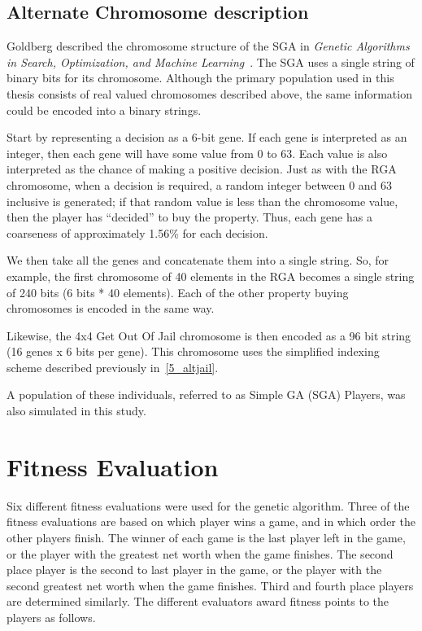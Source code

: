\subsection{Alternate Chromosome description} \label{5_altchromo}

Goldberg described the chromosome structure of the SGA in \emph{Genetic
Algorithms in Search, Optimization, and Machine
Learning}~\cite{goldberg1989genetic}. The SGA uses a single string of
binary bits for its chromosome. Although the primary population used in this thesis
consists of real valued chromosomes described above, the same information could
be encoded into a binary strings.

Start by representing a decision as a 6-bit gene. If each gene is interpreted as
an integer, then each gene will have some value from 0 to 63. Each value is also
interpreted as the chance of making a positive decision. Just as with the RGA
chromosome, when a decision is required, a random integer between 0 and 63
inclusive is generated; if that random value is less than the chromosome value,
then the player has ``decided'' to buy the property. Thus, each gene has a
coarseness of approximately 1.56\% for each decision.

We then take all the genes and concatenate them into a single string. So, for
example, the first chromosome of 40 elements in the RGA becomes a single string
of 240 bits (6 bits * 40 elements). Each of the other property buying
chromosomes is encoded in the same way.

Likewise, the 4x4 Get Out Of Jail chromosome is then encoded as a 96 bit string
(16 genes x 6 bits per gene). This chromosome uses the simplified indexing
scheme described previously in~\ref{5_altjail}.

A population of these individuals, referred to as Simple GA (SGA) Players, was
also simulated in this study.

\section{Fitness Evaluation} \label{5_fitnesseval}

Six different fitness evaluations were used for the genetic algorithm. Three of
the fitness evaluations are based on which player wins a game, and in which
order the other players finish. The winner of each game is the last player left
in the game, or the player with the greatest net worth when the game finishes.
The second place player is the second to last player in the game, or the player
with the second greatest net worth when the game finishes. Third and fourth
place players are determined similarly. The different evaluators award fitness
points to the players as follows.

